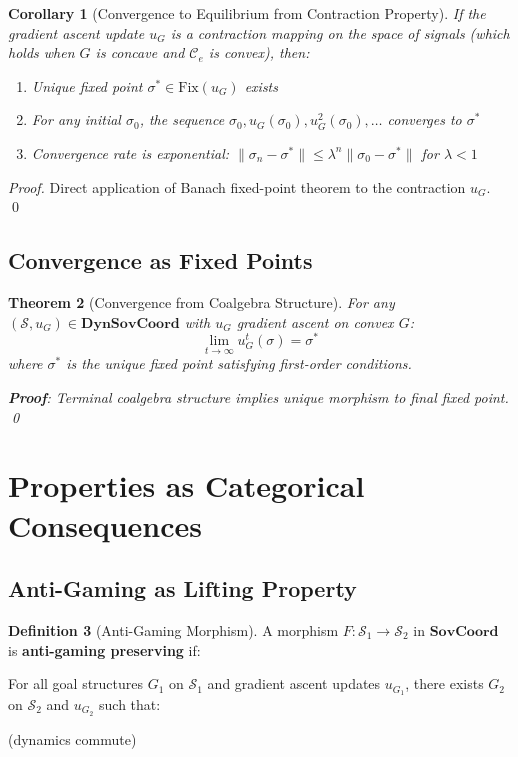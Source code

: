 \documentclass[11pt,a4paper]{article}
\newtheorem{theorem}{Theorem}[section]
\newtheorem{corollary}[theorem]{Corollary}
\theoremstyle{definition}
\newtheorem{definition}[theorem]{Definition}
\theoremstyle{remark}
\newcommand{\C}{\mathcal{C}}
\newcommand{\SovCoord}{\mathbf{SovCoord}}
\begin{document}
\begin{corollary}[Convergence to Equilibrium from Contraction Property]
If the gradient ascent update $u_G$ is a contraction mapping on the space of signals (which holds when $G$ is concave and $\C_e$ is convex), then:
\begin{enumerate}
\item Unique fixed point $\sigma^* \in \text{Fix}(u_G)$ exists
\item For any initial $\sigma_0$, the sequence $\sigma_0, u_G(\sigma_0), u_G^2(\sigma_0), \ldots$ converges to $\sigma^*$
\item Convergence rate is exponential: $\|\sigma_n - \sigma^*\| \le \lambda^n \|\sigma_0 - \sigma^*\|$ for $\lambda < 1$
\end{enumerate}
\end{corollary}

\begin{proof}
Direct application of Banach fixed-point theorem to the contraction $u_G$. \qed
\end{proof}

\subsection{Convergence as Fixed Points}

\begin{theorem}[Convergence from Coalgebra Structure]
For any $(\mathcal{S}, u_G) \in \mathbf{DynSovCoord}$ with $u_G$ gradient ascent on convex $G$:
\[ \lim_{t \to \infty} u_G^t(\sigma) = \sigma^* \]
where $\sigma^*$ is the unique fixed point satisfying first-order conditions.

\textbf{Proof}: Terminal coalgebra structure implies unique morphism to final fixed point. \qed
\end{theorem}

\section{Properties as Categorical Consequences}

\subsection{Anti-Gaming as Lifting Property}

\begin{definition}[Anti-Gaming Morphism]
A morphism $F: \mathcal{S}_1 \to \mathcal{S}_2$ in $\SovCoord$ is \textbf{anti-gaming preserving} if:

For all goal structures $G_1$ on $\mathcal{S}_1$ and gradient ascent updates $u_{G_1}$, there exists $G_2$ on $\mathcal{S}_2$ and $u_{G_2}$ such that:
\begin{center}
\end{center}
(dynamics commute)
\end{definition}
\end{document}

